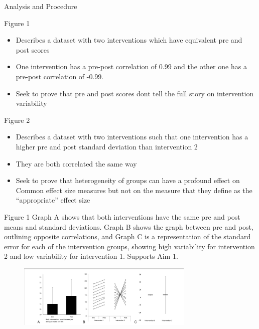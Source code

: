 \documentclass[
  ignorenonframetext,
  aspectratio=169,
]{beamer}
\providecommand{\tightlist}{%
  \setlength{\itemsep}{0pt}\setlength{\parskip}{0pt}}
\begin{document}
\begin{frame}{Analysis and Procedure}
\protect\hypertarget{analysis-and-procedure}{}
\begin{block}{Figure 1}
\protect\hypertarget{figure-1}{}
\begin{itemize}
\tightlist
\item
  Describes a dataset with two interventions which have equivalent pre
  and post scores
\item
  One intervention has a pre-post correlation of 0.99 and the other one
  has a pre-post correlation of -0.99.
\item
  Seek to prove that pre and post scores dont tell the full story on
  intervention variability
\end{itemize}
\end{block}

\begin{block}{Figure 2}
\protect\hypertarget{figure-2}{}
\begin{itemize}
\tightlist
\item
  Describes a dataset with two interventions such that one intervention
  has a higher pre and post standard deviation than intervention 2
\item
  They are both correlated the same way
\item
  Seek to prove that heterogeneity of groups can have a profound effect
  on Common effect size measures but not on the measure that they define
  as the ``appropriate'' effect size
\end{itemize}
\end{block}
\end{frame}

\begin{frame}{Figure 1}
\protect\hypertarget{figure-1-1}{}
Graph A shows that both interventions have the same pre and post means
and standard deviations. Graph B shows the graph between pre and post,
outlining opposite correlations, and Graph C is a representation of the
standard error for each of the intervention groups, showing high
variability for intervention 2 and low variability for intervention 1.
Supports Aim 1.

\begin{figure}[h]
    \centering
    \includegraphics[width=0.75\textwidth]{fig1.png}
\end{figure}
\end{frame}
\end{document}
